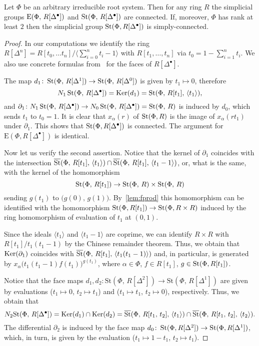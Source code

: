 \documentclass[oneside, 11pt]{amsart} \pdfoutput=1
\begin{document}
\begin{prop}\label{prop:pi1-StDelta} Let $\Phi$ be an arbitrary irreducible root system. Then for any ring $R$ the simplicial groups $\mathrm{E}(\Phi,\,R[\Delta^\bullet])$ and $\mathop{\mathrm{St}}\nolimits(\Phi,\,R[\Delta^\bullet])$ are connected. If, moreover, $\Phi$ has rank at least $2$ then the simplicial group $\mathop{\mathrm{St}}\nolimits(\Phi, R[\Delta^\bullet])$ is simply-connected. \end{prop}
\begin{proof}
In our computations we identify the ring $R[\Delta^n] = R[t_0,\ldots t_n]/\langle \sum_{i=0}^n t_i -1 \rangle$ with $R[t_1, \ldots, t_n]$ via $t_0 = 1 - \sum_{i=1}^n t_i$. We also use concrete formulas from~\cite{Jar83} for the faces of $R[\Delta^\bullet]$.

The map $d_1\colon\mathop{\mathrm{St}}\nolimits(\Phi,\,R[\Delta^1])\rightarrow\mathop{\mathrm{St}}\nolimits(\Phi,\,R[\Delta^0])$ is given by $t_1\mapsto0$, therefore \[N_1\mathop{\mathrm{St}}\nolimits(\Phi,\,R[\Delta^\bullet])=\mathop{\mathrm{Ker}}\nolimits(d_1)=\mathop{\mathrm{St}}\nolimits(\Phi,\,R[t_1],\,\langle t_1\rangle),\]
and $\partial_1\colon N_1\mathop{\mathrm{St}}\nolimits(\Phi,\,R[\Delta^\bullet])\rightarrow N_0\mathop{\mathrm{St}}\nolimits(\Phi,\,R[\Delta^\bullet])=\mathop{\mathrm{St}}\nolimits(\Phi,\,R)$ is induced by $d_0$, which sends $t_1$ to $t_0=1$. 
It is clear that $x_\alpha(r)$ of $\mathop{\mathrm{St}}\nolimits(\Phi, R)$ is the image of $x_\alpha(rt_1)$ under $\partial_1$.
This shows that $\mathop{\mathrm{St}}\nolimits(\Phi, R[\Delta^\bullet])$ is connected. The argument for $\mathrm{E}(\Phi, R[\Delta^\bullet])$ is identical.

Now let us verify the second assertion. Notice that the kernel of $\partial_1$ coincides with the intersection $\overline{\mathop{\mathrm{St}}\nolimits}(\Phi,\,R[t_1],\,\langle t_1\rangle)\cap\overline{\mathop{\mathrm{St}}\nolimits}(\Phi,\,R[t_1],\,\langle t_1-1 \rangle )$, or, what is the same, with the kernel of the homomorphism
\[\mathop{\mathrm{St}}\nolimits(\Phi,\,R[t_1])\rightarrow\mathop{\mathrm{St}}\nolimits(\Phi,\,R)\times\mathop{\mathrm{St}}\nolimits(\Phi,\,R)\]
sending $g(t_1)$ to $\big(g(0),\,g(1)\big)$. By~\cref{lem:fprod} this homomorphism can be identified with the homomorphism $\mathop{\mathrm{St}}\nolimits(\Phi, R[t_1]) \to \mathop{\mathrm{St}}\nolimits(\Phi, R\times R)$ induced by the ring homomorphism of evaluation of $t_1$ at $(0, 1)$.

Since the ideals $\langle t_1 \rangle$ and $\langle t_1-1 \rangle$ are coprime, we can identify $R\times R$ with $R[t_1]/t_1(t_1-1)$ by the Chinese remainder theorem. Thus, we obtain that $\mathop{\mathrm{Ker}}\nolimits(\partial_1)$ coincides with $\overline{\mathop{\mathrm{St}}\nolimits}(\Phi,\,R[t_1],\,\langle t_1(t_1-1) \rangle)$ and, in particular, is generated by $x_\alpha\big(t_1(t_1-1)f(t_1)\big)^{g(t_1)}$, where $\alpha \in \Phi$, $f\in R[t_1]$, $g \in \mathop{\mathrm{St}}\nolimits(\Phi, R[t_1])$.

Notice that the face maps $d_1, d_2\colon\mathrm{St}(\Phi,\,R[\Delta^2])\rightarrow\mathrm{St}(\Phi,\,R[\Delta^1])$ are given by evaluations ($t_1\mapsto0$, $t_2\mapsto t_1$) and ($t_1\mapsto t_1$, $t_2\mapsto0$), respectively. Thus, we obtain that \[N_2\mathrm{St}(\Phi,\,R[\Delta^\bullet])=\mathop{\mathrm{Ker}}\nolimits(d_1)\cap\mathop{\mathrm{Ker}}\nolimits(d_2)=\overline{\mathop{\mathrm{St}}\nolimits}(\Phi,\,R[t_1,\,t_2],\,\langle t_1\rangle )\cap\overline{\mathop{\mathrm{St}}\nolimits}(\Phi,\,R[t_1,\,t_2],\,\langle t_2\rangle).\]
The differential $\partial_2$ is induced by the face map $d_0 \colon \mathop{\mathrm{St}}\nolimits(\Phi, R[\Delta^2]) \to \mathop{\mathrm{St}}\nolimits(\Phi, R[\Delta^1])$, which, in turn, is given by the evaluation ($t_1 \mapsto 1-t_1$, $t_2 \mapsto t_1$). 


\end{proof}
\end{document}
